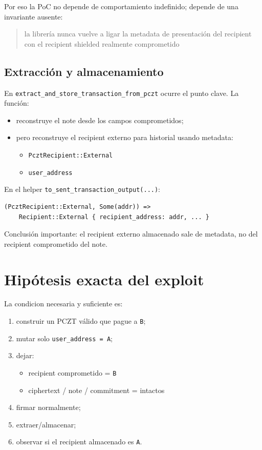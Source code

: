 \documentclass[11pt,a4paper]{article}
\begin{document}
Por eso la PoC no depende de comportamiento indefinido; depende de una
invariante ausente:

\begin{quote}
la librer\'ia nunca vuelve a ligar la metadata de presentaci\'on del recipient
con el recipient shielded realmente comprometido
\end{quote}

\subsection{Extracción y almacenamiento}

En \texttt{extract\_and\_store\_transaction\_from\_pczt} ocurre el punto clave. La función:

\begin{itemize}[leftmargin=2em]
    \item reconstruye el note desde los campos comprometidos;
    \item pero reconstruye el recipient externo para historial usando metadata:
    \begin{itemize}
        \item \texttt{PcztRecipient::External}
        \item \texttt{user\_address}
    \end{itemize}
\end{itemize}

En el helper \texttt{to\_sent\_transaction\_output(...)}:

\begin{lstlisting}[style=plain]
(PcztRecipient::External, Some(addr)) =>
    Recipient::External { recipient_address: addr, ... }
\end{lstlisting}

Conclusión importante: el recipient externo almacenado sale de metadata, no del recipient comprometido del note.

\section{Hipótesis exacta del exploit}

La condicion necesaria y suficiente es:

\begin{enumerate}[leftmargin=2em]
    \item construir un PCZT válido que pague a \texttt{B};
    \item mutar solo \texttt{user\_address = A};
    \item dejar:
    \begin{itemize}
        \item recipient comprometido = \texttt{B}
        \item ciphertext / note / commitment = intactos
    \end{itemize}
    \item firmar normalmente;
    \item extraer/almacenar;
    \item observar si el recipient almacenado es \texttt{A}.
\end{enumerate}
\end{document}
